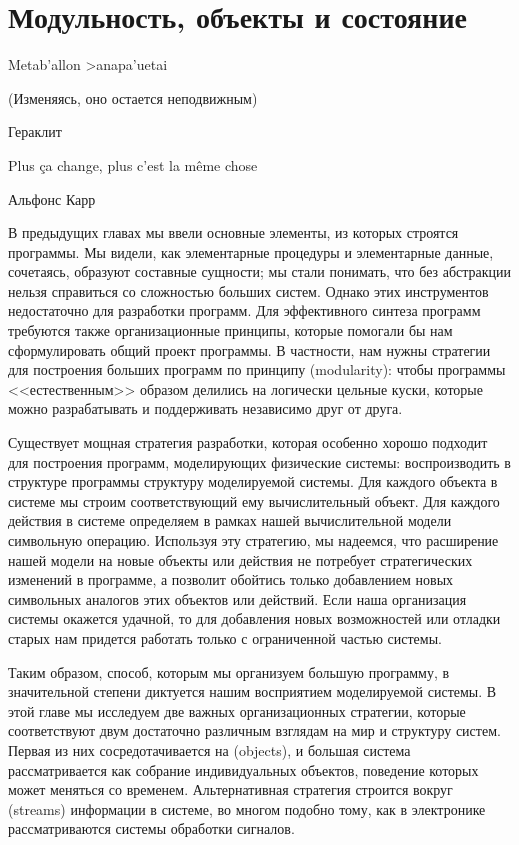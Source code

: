 \chapter{Модульность, объекты и состояние}
\label{MODULARITY-OBJECTS-AND-STATE}
\thispagestyle{empty}
\epigraph{
\textgreek{Metab'allon >anapa'uetai}

(Изменяясь, оно остается неподвижным)}{Гераклит}

\epigraph{
Plus \c{c}a change, plus c'est la m\^eme chose}{Альфонс Карр}

В предыдущих главах мы ввели основные элементы, из которых
строятся программы.  Мы видели, как элементарные процедуры и
элементарные данные, сочетаясь, образуют составные сущности; мы
стали понимать, что без абстракции нельзя
справиться со сложностью больших систем.  Однако этих инструментов
недостаточно для разработки программ.  Для эффективного синтеза программ
требуются также организационные принципы, которые помогали бы нам
сформулировать общий проект программы.  В частности, нам нужны
стратегии для построения больших программ по принципу
 (modularity): чтобы программы
<<естественным>> образом делились на логически цельные куски, которые
можно разрабатывать и поддерживать независимо друг от друга.

Существует мощная
стратегия разработки, которая особенно хорошо
подходит для построения программ, моделирующих физические системы:
воспроизводить в структуре программы структуру
моделируемой системы.  Для каждого объекта в системе мы строим
соответствующий ему вычислительный объект.  Для каждого действия в
системе определяем в рамках нашей
вычислительной модели символьную операцию.  Используя эту стратегию, мы надеемся, что
расширение нашей модели на новые объекты или действия не потребует
стратегических изменений в программе, а позволит обойтись только добавлением новых
символьных аналогов этих объектов или действий.  Если наша организация
системы окажется удачной, то для добавления новых возможностей или
отладки старых нам придется работать только с ограниченной частью
системы.

Таким образом, способ, которым мы
организуем большую программу, в значительной степени диктуется нашим восприятием моделируемой
системы.  В этой главе мы исследуем две важных организационных
стратегии, которые соответствуют двум достаточно различным взглядам
на мир и структуру систем.  Первая из них сосредотачивается на
 (objects), и большая система
рассматривается как собрание индивидуальных
объектов, поведение которых может меняться со временем.
Альтернативная стратегия строится вокруг
 (streams) информации в системе, во многом
подобно тому, как в электронике рассматриваются системы обработки
сигналов.

